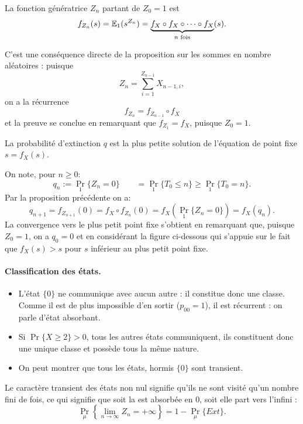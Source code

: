 \begin{proposition*}
  La fonction génératrice $Z_n$ partant de $Z_0 = 1$ est
  $$
  f_{Z_n}(s) = \operatorname{\mathbb{E}}_1(s^{Z_n}) = \underset{n \text{ fois}}{\underbrace{f_X \circ f_X \circ \dots \circ f_X}}(s).
  $$
\end{proposition*}

\proof 
C'est une conséquence directe de la proposition sur les sommes en nombre aléatoires : puisque
$$
Z_n = \sum_{i=1}^{Z_{n-1}} X_{n-1, i},
$$
on a la récurrence 
$$
f_{Z_n} = f_{Z_{n-1}} \circ f_X
$$
et la preuve se conclue en remarquant que $f_{Z_1} = f_X$, puisque $Z_0 = 1$.

\begin{proposition*}
  La probabilité d'extinction $q$ est la plus petite solution de l'équation de point fixe $s = f_X(s)$.
\end{proposition*}

\proof
On note, pour $n \geq 0$:
$$
q_n := \Pr_1\{Z_n = 0\} \qquad = \Pr_1\{T_0 \leq n\}\geq \Pr_1\{T_0 = n\}.
$$
Par la proposition précédente on a:
$$
q_{n+1} = f_{Z_{n+1}}(0) = f_X \circ f_{Z_n} (0) = f_X(\Pr_1\{Z_n = 0\}) = f_X(q_n).
$$
La convergence vers le plus petit point fixe s'obtient en remarquant que, puisque $Z_0 = 1$, on a $q_0 = 0$ et en considérant la figure ci-dessous
qui s'appuie sur le fait que $f_X(s) > s$ pour $s$ inférieur au plus petit point fixe.
\eproof


\paragraph*{Classification des états.} 
\begin{itemize}
 \item L'état $\{0\}$ ne communique avec aucun autre : il constitue donc une classe. Comme il est de plus impossible d'en sortir ($p_{00} = 1$), il est récurrent : on parle d'état absorbant.
 \item Si $\Pr\{X \geq 2\} > 0$, tous les autres états communiquent, ils constituent donc une unique classe et possède tous la même nature.
 \item On peut montrer que tous les états, hormis $\{0\}$ sont transient.
\end{itemize}

Le caractère transient des états non nul signifie qu'ils ne sont visité qu'un nombre fini de fois, ce qui signifie que soit la \cM est absorbée en 0, soit elle part vers l'infini : 
$$
\Pr_\mu\left\{ \lim_{n \rightarrow \infty} Z_n = + \infty\right\} = 1 - \Pr_\mu\{Ext\}.
$$

